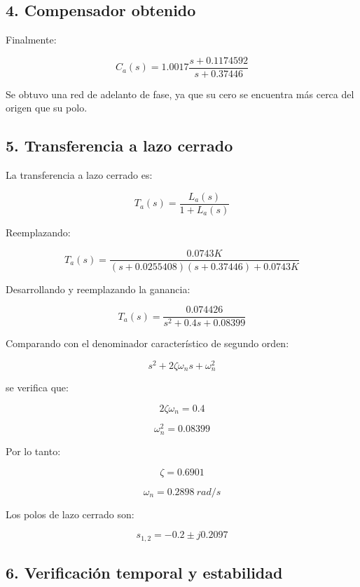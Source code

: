 \documentclass[10pt]{article}
\begin{document}
\subsection*{4. Compensador obtenido}

Finalmente:

\begin{equation}
    \boxed{
    C_a(s)=
    1.0017
    \frac{s+0.1174592}{s+0.37446}
    }
\end{equation}

Se obtuvo una red de adelanto de fase,
ya que su cero se encuentra más cerca
del origen que su polo.

\subsection*{5. Transferencia a lazo cerrado}

La transferencia a lazo cerrado es:

\[
T_a(s)=\frac{L_a(s)}{1+L_a(s)}
\]

Reemplazando:

\[
T_a(s)=
\frac{0.0743K}
{(s+0.0255408)(s+0.37446)+0.0743K}
\]

Desarrollando y reemplazando la ganancia:

\begin{equation}
    \boxed{
    T_a(s)=
    \frac{0.074426}
    {s^2+0.4s+0.08399}
    }
\end{equation}

Comparando con el denominador
característico de segundo orden:

\[
s^2+2\zeta\omega_ns+\omega_n^2
\]

se verifica que:

\[
2\zeta\omega_n=0.4
\]

\[
\omega_n^2=0.08399
\]

Por lo tanto:

\[
\zeta=0.6901
\]

\[
\omega_n=0.2898\ rad/s
\]

Los polos de lazo cerrado son:

\begin{equation}
    \boxed{
    s_{1,2}=-0.2\pm j0.2097
    }
\end{equation}

\subsection*{6. Verificación temporal y estabilidad}
\end{document}
